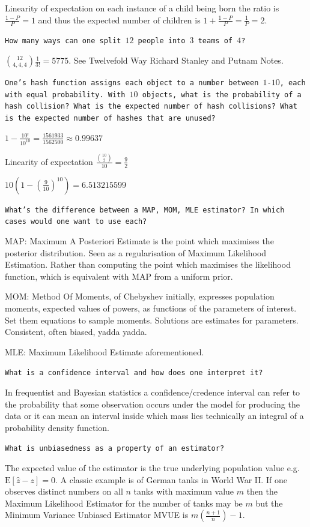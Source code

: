 Linearity of expectation on each instance of a child being born the ratio is $\frac{1-P}{P}=\boxed{1}$ and thus the expected number of children is $1+\frac{1-P}{P}=\frac{1}{P}=\boxed{2}$.

\texttt{How many ways can one split $12$ people into $3$ teams of $4$?}

$ \binom{12}{4,4,4} \frac{1}{3!} = \boxed{5775}$. See Twelvefold Way Richard Stanley and Putnam Notes.

\texttt{One's hash function assigns each object to a number between $1$-$10$, each with equal probability. With $10$ objects, what is the probability of a hash collision? What is the expected number of hash collisions? What is the expected number of hashes that are unused?}

$1-\frac{10!}{10^{10}}=\boxed{\frac{1561933}{1562500}}\approx 0.99637$

Linearity of expectation $\frac{\binom{10}{2}}{10}=\boxed{\frac{9}{2}}$

$10\left(1-\left( \frac{9}{10} \right)^{10} \right)=\boxed{6.513215599}$

\texttt{What's the difference between a MAP, MOM, MLE estimator? In which cases would one want to use each?}

MAP: Maximum A Posteriori Estimate is the point which maximises the posterior distribution. Seen as a regularisation of Maximum Likelihood Estimation. Rather than computing the point which maximises the likelihood function, which is equivalent with MAP from a uniform prior.

MOM: Method Of Moments, of Chebyshev initially, expresses population moments, expected values of powers, as functions of the parameters of interest. Set them equations to sample moments. Solutions are estimates for parameters. Consistent, often biased, yadda yadda.

MLE: Maximum Likelihood Estimate aforementioned.

\texttt{What is a confidence interval and how does one interpret it?}

In frequentist and Bayesian statistics a confidence/credence interval can refer to the probability that some observation occurs under the model for producing the data or it can mean an interval inside which mass lies technically an integral of a probability density function.

\texttt{What is unbiasedness as a property of an estimator?}

The expected value of the estimator is the true underlying population value e.g. $\text{E}[\hat{z}-z] = 0$. A classic example is of German tanks in World War II. If one observes distinct numbers on all $n$ tanks with maximum value $m$ then the Maximum Likelihood Estimator for the number of tanks may be $m$ but the Minimum Variance Unbiased Estimator MVUE is $m \left ( \frac{n+1}{n} \right ) - 1$.

